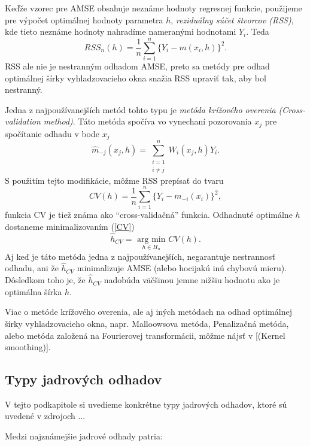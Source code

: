 Keďže vzorec pre AMSE obsahuje neznáme hodnoty regresnej funkcie, použijeme pre výpočet optimálnej hodnoty parametra $h$, \textit{reziduálny súčet štvorcov (RSS)}, kde tieto neznáme hodnoty nahradíme nameranými hodnotami $Y_i$.
Teda
\begin{equation}
 RSS_n(h) = \frac{1}{n}\sum\limits_{i=1}^{n} {\{Y_i - m(x_i,h)\}}^2.
\end{equation}
 RSS ale nie je nestranným odhadom AMSE, preto sa metódy pre odhad optimálnej šírky vyhladzovacieho okna snažia RSS upraviť tak, aby bol nestranný. 
 
 Jedna z najpoužívanejších metód tohto typu je \textit{metóda krížového overenia (Cross-validation method)}. Táto metóda spočíva vo vynechaní pozorovania $x_j$ pre spočítanie odhadu v bode $x_j$
 \begin{equation*}
\hat{m}_{-j}(x_j,h) = \sum\limits_{\substack{i=1 \\ i\neq j}}^{n}W_i(x_j,h)Y_i.
\end{equation*}
S použitím tejto modifikácie, môžme RSS prepísať do tvaru
\begin{equation}\label{CV}
CV(h) = \frac{1}{n}\sum\limits_{i=1}^{n} {\{Y_i - m_{-i}(x_i)\}}^2,
\end{equation}
funkcia CV je tiež známa ako ``cross-validačná'' funkcia. Odhadnuté optimálne $h$ dostaneme minimalizovaním (\ref{CV})
\begin{equation}
\hat{h}_{CV} = \underset{h \in H_n}{\textrm{ arg min }} CV(h).
\end{equation}
Aj keď je táto metóda jedna z najpoužívanejších, negarantuje nestrannosť odhadu, ani že $\hat{h}_{CV}$ minimalizuje AMSE (alebo hocijakú inú chybovú mieru). Dôsledkom toho je, že $\hat{h}_{CV}$  nadobúda väčšinou jemne nižšiu hodnotu ako je optimálna šírka $h$.

Viac o metóde krížového overenia, ale aj iných metódach na odhad optimálnej šírky vyhladzovacieho okna, napr. Malloowsova metóda, Penalizačná metóda, alebo metóda založená na Fourierovej transformácii, môžme nájsť v [(Kernel smoothing)].
\subsection{Typy jadrových odhadov}
V tejto podkapitole si uvedieme konkrétne typy jadrových odhadov, ktoré sú uvedené v zdrojoch ...

Medzi najznámejšie jadrové odhady patria:

